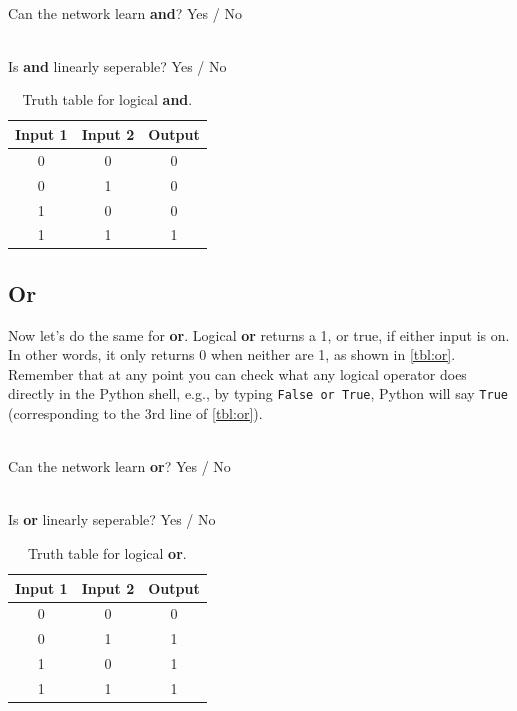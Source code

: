 \documentclass[a4paper,10pt]{article}
\begin{document}
\ \\ Can the network learn \textbf{and}?    Yes / No                                             

\ \\ Is \textbf{and} linearly seperable? Yes / No

\begin{table}[ht]
 \centering
 \begin{tabular}[t]{ccc}
Input 1 & Input 2 & Output\\ \hline
0 & 0 & 0\\
0 & 1 & 0 \\
1 & 0 & 0 \\
1 & 1 & 1 \\

\end{tabular} \caption{Truth table for logical \textbf{and}.}
 \label{tbl:and}
\end{table}

\subsection{Or}

Now let's do the same for \textbf{or}. Logical \textbf{or} returns a 1, or true, if either input is on. In other words, it only returns 0 when neither are 1, as shown in \autoref{tbl:or}. Remember that at any point you can check what any logical operator does directly in the Python shell, e.g., by typing \texttt{False or True}, Python will say \texttt{True} (corresponding to the 3rd line of \autoref{tbl:or}).

\ \\ Can the network learn \textbf{or}?    Yes / No         

\ \\ Is \textbf{or} linearly seperable? Yes / No                                    

\begin{table}[ht]
 \centering
 \begin{tabular}[t]{ccc}
Input 1 & Input 2 & Output\\ \hline
0 & 0 & 0\\
0 & 1 & 1 \\
1 & 0 & 1 \\
1 & 1 & 1 \\

\end{tabular} \caption{Truth table for logical \textbf{or}.}
 \label{tbl:or}
\end{table}
\end{document}
